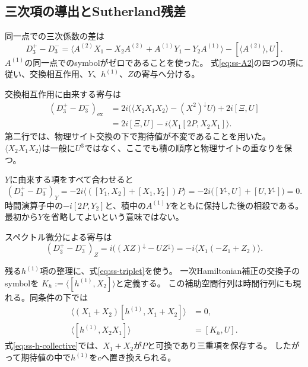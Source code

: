 \subsection{三次項の導出とSutherland残差}

同一点での三次係数の差は
\begin{equation}
D_3^+-D_3^-=
\langle A^{(2)}X_1-X_2A^{(2)}+A^{(1)}Y_1-Y_2A^{(1)}\rangle
-[\langle A^{(2)}\rangle,U].
\label{eq:ss-D3-start}
\end{equation}
$A^{(1)}$の同一点でのsymbolがゼロであることを使った。
式\eqref{eq:ss-A2}の四つの項に従い、交換相互作用、$Y$、$h^{(1)}$、$Z$の寄与へ分ける。

交換相互作用に由来する寄与は
\begin{align}
(D_3^+-D_3^-)_{\mathrm{ex}}
&=2i\bigl(\langle X_2X_1X_2\rangle-(X^2)^\downarrow U\bigr)
  +2i[\Xi,U]\nonumber\\
&=2i[\Xi,U]-i\langle X_1[2P,X_2X_1]\rangle.
\label{eq:ss-cubic-exchange}
\end{align}
第二行では、物理サイト交換の下で期待値が不変であることを用いた。
$\langle X_2X_1X_2\rangle$は一般に$U^3$ではなく、ここでも積の順序と物理サイトの重なりを保つ。

$Y$に由来する項をすべて合わせると
\begin{equation}
(D_3^+-D_3^-)_{Y}
=-2i\langle([Y_1,X_2]+[X_1,Y_2])P\rangle
=-2i\bigl([Y^\downarrow,U]+[U,Y^\downarrow]\bigr)=0.
\label{eq:ss-Y-cancel}
\end{equation}
時間演算子中の$-i[2P,Y_2]$と、積中の$A^{(1)}Y$をともに保持した後の相殺である。
最初から$Y$を省略してよいという意味ではない。

スペクトル微分による寄与は
\begin{equation}
(D_3^+-D_3^-)_{Z}
=i\bigl((XZ)^\downarrow-UZ^\downarrow\bigr)
=-i\langle X_1(-Z_1+Z_2)\rangle.
\label{eq:ss-Z-part}
\end{equation}

残る$h^{(1)}$項の整理に、式\eqref{eq:ss-triplet}を使う。
一次Hamiltonian補正の交換子のsymbolを
$K_h:=\langle[h^{(1)},X_2]\rangle$と定義する。
この補助空間行列は時間行列にも現れる。同条件の下では
\begin{align}
\langle(X_1+X_2)[h^{(1)},X_1+X_2]\rangle&=0,
\label{eq:ss-h-collective}\\
\langle[h^{(1)},X_2X_1]\rangle&=[K_h,U].
\label{eq:ss-h-product}
\end{align}
式\eqref{eq:ss-h-collective}では、$X_1+X_2$が$P$と可換であり三重項を保存する。
したがって期待値の中で$h^{(1)}$を$c$へ置き換えられる。

